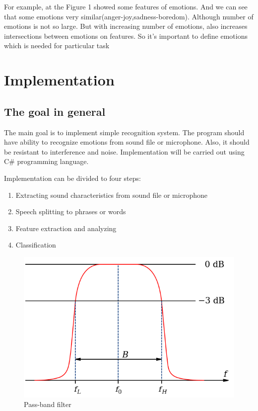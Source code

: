 \documentclass[12pt, letterpaper]{article}
\begin{document}
For example, at the Figure 1 showed some features of emotions. And we can see that some emotions very similar(anger-joy,sadness-boredom). Although number of emotions is not so large. But with increasing number of emotions, also increases intersections between emotions on features. So it's important to define emotions which is needed for particular task

\section{Implementation}
\subsection{The goal in general}
The main goal is to implement simple recognition system. The program should have ability to recognize emotions from sound file or microphone. Also, it should be resistant to interference and noise. Implementation will be carried out using C\# programming language.

Implementation can be divided to four steps:
\begin{enumerate}
	\item Extracting sound characteristics from sound file or microphone
	\item Speech splitting to phrases or words
	\item Feature extraction and analyzing
	\item Classification
\end{enumerate}

\begin{figure}
	\centering
		\includegraphics[scale=0.7]{images/pass-band-filter.png}
	\caption{Pass-band filter}
	\label{fig:pass-band-filter}
\end{figure}
\end{document}
